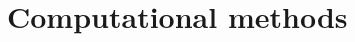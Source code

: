\documentclass[aps,prl,reprint,amsmath,amssymb]{revtex4-1}
\begin{document}

 
\section{Computational methods}
\end{document}

